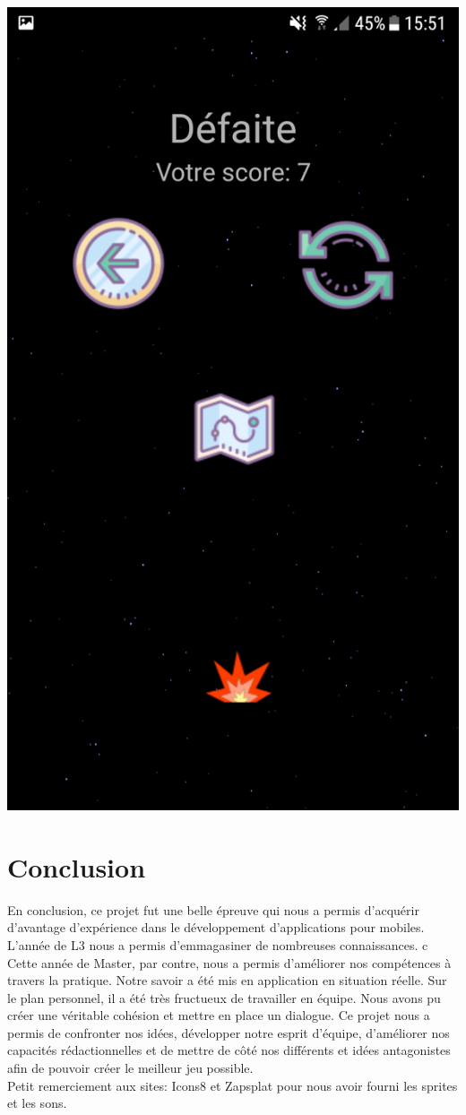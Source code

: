 \documentclass{article}
\begin{document}
\begin{center}
    \includegraphics[scale = 0.18]{images/Android_3.png}
\end{center}

\newpage
\part*{Conclusion}
En conclusion, ce projet fut une belle épreuve qui nous a permis d’acquérir d'avantage d'expérience dans le développement d'applications pour mobiles.\\
L'année de L3 nous a permis d'emmagasiner de nombreuses connaissances. c
Cette année de Master, par contre, nous a permis d'améliorer nos compétences à travers la pratique. Notre savoir a été mis en application en situation réelle. 
Sur le plan personnel, il a été très fructueux de travailler en équipe. Nous avons pu créer une véritable cohésion et mettre en place un dialogue. Ce projet nous a permis de confronter nos idées, développer notre esprit d'équipe, d'améliorer nos capacités rédactionnelles et de mettre de côté nos différents et idées antagonistes afin de pouvoir créer le meilleur jeu possible.\\

Petit remerciement aux sites: Icons8 \cite{Icons8} et Zapsplat \cite{Zapsplat} pour nous avoir fourni les sprites et les sons.


\newpage


\end{document}
